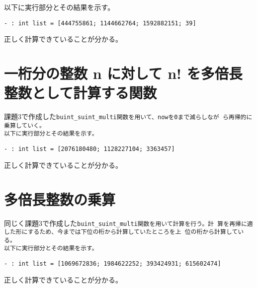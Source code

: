 \documentclass[a4paper,8pt]{jarticle}
\begin{document}
以下に実行部分とその結果を示す。

\begin{lstlisting}
- : int list = [444755861; 1144662764; 1592882151; 39]
\end{lstlisting}
正しく計算できていることが分かる。

\section{一桁分の整数 n に対して n! を多倍長整数として計算する関数}

課題3で作成した\tt{buint\_suint\_multi}関数を用いて、nowを0まで減らしなが
ら再帰的に乗算していく。\\

以下に実行部分とその結果を示す。

\begin{lstlisting}
- : int list = [2076180480; 1128227104; 3363457]
\end{lstlisting}
正しく計算できていることが分かる。

\section{多倍長整数の乗算}

同じく課題3で作成した\tt{buint\_suint\_multi}関数を用いて計算を行う。計
算を再帰に適した形にするため、今までは下位の桁から計算していたところを上
位の桁から計算している。\\

以下に実行部分とその結果を示す。

\begin{lstlisting}
- : int list = [1069672836; 1984622252; 393424931; 615602474]
\end{lstlisting}
正しく計算できていることが分かる。
\end{document}
